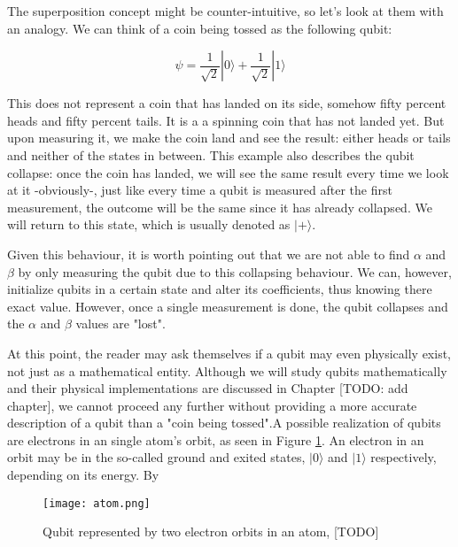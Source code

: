	The superposition concept might be counter-intuitive, so let's look at them with an analogy. We can think of a coin being tossed as the following qubit:
	
	$$ \psi = \frac{1}{\sqrt{2}} |0\rangle + \frac{1}{\sqrt{2}} |1\rangle $$
	
	This does not represent a coin that has landed on its side, somehow fifty percent heads and fifty percent tails. It is a a spinning coin that has not landed yet. But upon measuring it, we make the coin land and see the result: either heads or tails and neither of the states in between. This example also describes the qubit collapse: once the coin has landed, we will see the same result every time we look at it -obviously-, just like every time a qubit is measured after the first measurement, the outcome will be the same since it has already collapsed. We will return to this state, which is usually denoted as $|+\rangle$.
	
	Given this behaviour, it is worth pointing out that we are not able to find $\alpha$ and $\beta$ by only measuring the qubit due to this collapsing behaviour. We can, however, initialize qubits in a certain state and alter its coefficients, thus knowing there exact value. However, once a single measurement is done, the qubit collapses and the $\alpha$ and $\beta$ values are "lost".
	
	At this point, the reader may ask themselves if a qubit may even physically exist, not just as a mathematical entity. Although we will study qubits mathematically and their physical implementations are discussed in Chapter [TODO: add chapter], we cannot proceed any further without providing a more accurate description of a qubit than a "coin being tossed".A possible realization of qubits are electrons in an single atom's orbit, as seen in Figure \ref{fig 1.1}. An electron in an orbit may be in the so-called ground and exited states, $|0\rangle$ and $|1\rangle$ respectively, depending on its energy. By 
	
	\begin{figure}[h]
		\texttt{[image: atom.png]}
		\centering
		\caption{Qubit represented by two electron orbits in an atom, [TODO]}
		\label{fig 1.1}
	\end{figure}
	
	
	

